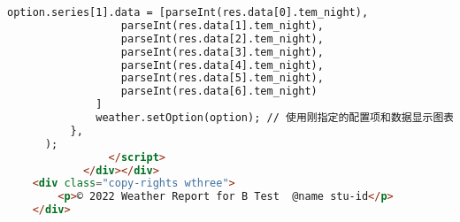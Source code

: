 \documentclass[12pt,AutoFakeBold]{article}
\begin{document}
\begin{appendices}
\begin{lstlisting}[language=html]
              option.series[1].data = [parseInt(res.data[0].tem_night),
                  parseInt(res.data[1].tem_night),
                  parseInt(res.data[2].tem_night),
                  parseInt(res.data[3].tem_night),
                  parseInt(res.data[4].tem_night),
                  parseInt(res.data[5].tem_night),
                  parseInt(res.data[6].tem_night)
              ]
              weather.setOption(option); // 使用刚指定的配置项和数据显示图表。
          },
      );
                </script>
            </div></div>
	<div class="copy-rights wthree">		 	
		<p>© 2022 Weather Report for B Test  @name stu-id</p>
	</div>
\end{lstlisting}

\end{appendices}




%  
\end{document}
